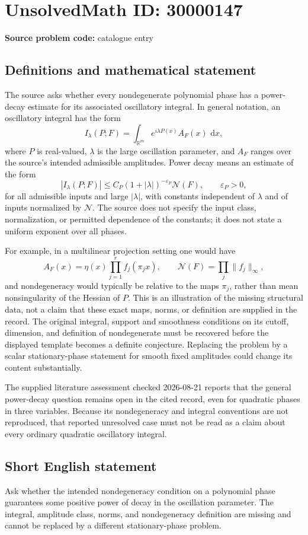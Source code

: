 \documentclass[11pt]{article}
\newcommand{\R}{\mathbb{R}}
\newcommand{\dd}{\,\mathrm{d}}
\begin{document}
\section*{UnsolvedMath ID: 30000147}
\textbf{Source problem code:} catalogue entry
\subsection{Definitions and mathematical statement}
The source asks whether every nondegenerate polynomial phase has a power-decay estimate for its associated oscillatory integral. In general notation, an oscillatory integral has the form
\[
I_\lambda(P;F)=\int_{\R^m}e^{i\lambda P(x)}A_F(x)\,\dd x,
\]
where \(P\) is real-valued, \(\lambda\) is the large oscillation parameter, and \(A_F\) ranges over the source's intended admissible amplitudes. Power decay means an estimate of the form
\[
|I_\lambda(P;F)|\leq C_P(1+|\lambda|)^{-\varepsilon_P}\mathcal N(F),
\qquad\varepsilon_P>0,
\]
for all admissible inputs and large \(|\lambda|\), with constants independent of \(\lambda\) and of inputs normalized by \(\mathcal N\). The source does not specify the input class, normalization, or permitted dependence of the constants; it does not state a uniform exponent over all phases.

For example, in a multilinear projection setting one would have
\[
A_F(x)=\eta(x)\prod_{j=1}^r f_j(\pi_jx),
\qquad\mathcal N(F)=\prod_j\|f_j\|_\infty,
\]
and nondegeneracy would typically be relative to the maps \(\pi_j\), rather than mean nonsingularity of the Hessian of \(P\). This is an illustration of the missing structural data, not a claim that these exact maps, norms, or definition are supplied in the record. The original integral, support and smoothness conditions on its cutoff, dimension, and definition of nondegenerate must be recovered before the displayed template becomes a definite conjecture. Replacing the problem by a scalar stationary-phase statement for smooth fixed amplitudes could change its content substantially.

The supplied literature assessment checked 2026-08-21 reports that the general power-decay question remains open in the cited record, even for quadratic phases in three variables. Because its nondegeneracy and integral conventions are not reproduced, that reported unresolved case must not be read as a claim about every ordinary quadratic oscillatory integral.
\subsection{Short English statement}
Ask whether the intended nondegeneracy condition on a polynomial phase guarantees some positive power of decay in the oscillation parameter. The integral, amplitude class, norms, and nondegeneracy definition are missing and cannot be replaced by a different stationary-phase problem.
\end{document}
